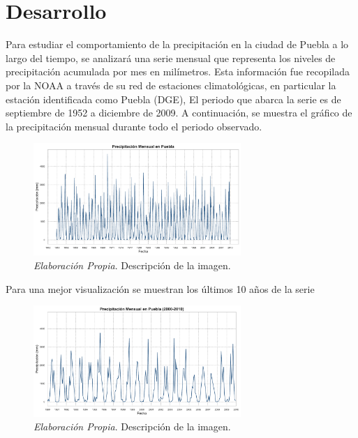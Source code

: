 \documentclass[12pt,letterpaper]{article}   %
\begin{document}
\newpage

\section{Desarrollo}
Para estudiar el comportamiento de la precipitación en la ciudad de Puebla a lo largo del tiempo, se analizará una serie mensual que representa los niveles de precipitación acumulada por mes en milímetros. Esta información fue recopilada por la NOAA a través de su red de estaciones climatológicas, en particular la estación identificada como Puebla (DGE), El periodo que abarca la serie es de septiembre de 1952 a diciembre de 2009. A continuación, se muestra el gráfico de la precipitación mensual durante todo el periodo observado.

\begin{figure}[h!]
    \centering
    \includegraphics[width=0.7\textwidth]{imagenes/01-01-precipitacion.pdf}
    \caption{\textit{Elaboración Propia}. Descripción de la imagen.}
    \label{fig:mi_imagen}
\end{figure}

Para una mejor visualización se muestran los últimos 10 años de la serie

\begin{figure}[h!]
    \centering
    \includegraphics[width=0.7\textwidth]{imagenes/01-02-precipitacion-zoom.pdf}
    \caption{\textit{Elaboración Propia}. Descripción de la imagen.}
    \label{fig:mi_imagen}
\end{figure}
\end{document}
